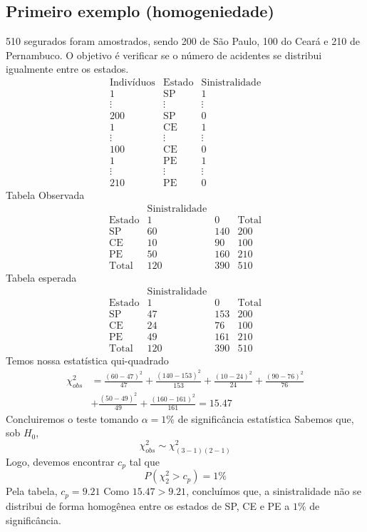 \documentclass[
  letterpaper,
  DIV=11,
  numbers=noendperiod]{scrreprt}
\begin{document}
\subsection{Primeiro exemplo
(homogeniedade)}\label{primeiro-exemplo-homogeniedade}

510 segurados foram amostrados, sendo 200 de São Paulo, 100 do Ceará e
210 de Pernambuco. O objetivo é verificar se o número de acidentes se
distribui igualmente entre os estados. \[
\begin{array}{ccc}
\mathrm{Indivíduos}  & \mathrm{Estado}  & \mathrm{Sinistralidade}\\
1 & \mathrm{SP} & 1 \\
\vdots  & \vdots & \vdots \\
200  &  \mathrm{SP}  & 0 \\
1 & \mathrm{CE} & 1 \\
\vdots  & \vdots & \vdots \\
100  &  \mathrm{CE}  & 0 \\
1 & \mathrm{PE} & 1 \\
\vdots  & \vdots & \vdots \\
210  &  \mathrm{PE}  & 0
\end{array}
\] Tabela Observada \[
\begin{array}{c|cc|c}
 &     \mathrm{Sinistralidade}   &  \\
\mathrm{Estado}  & 1 & 0 &  \mathrm{Total} \\
\hline
\mathrm{SP} & 60 & 140 & 200 \\
\mathrm{CE} & 10 & 90 & 100 \\
\mathrm{PE} & 50 & 160 & 210 \\
\hline
\mathrm{Total} & 120 & 390 & 510
\end{array}
\] Tabela esperada \[
\begin{array}{c|cc|c}
 &     \mathrm{Sinistralidade}   &  \\
\mathrm{Estado}  & 1 & 0 &  \mathrm{Total} \\
\hline
\mathrm{SP} & 47 & 153 & 200 \\
\mathrm{CE} & 24 & 76 & 100 \\
\mathrm{PE} & 49 & 161 & 210 \\
\hline
\mathrm{Total} & 120 & 390 & 510
\end{array}
\] Temos nossa estatística qui-quadrado \[
\begin{aligned}
\chi^2_{obs} &= \frac{(60-47)^2}{47} + \frac{(140-153)^2}{153} + \frac{(10-24)^2}{24} + \frac{(90-76)^2}{76} \\
&+ \frac{(50-49)^2}{49} + \frac{(160-161)^2}{161} = 15.47
\end{aligned}
\] Concluiremos o teste tomando \(\alpha = 1\%\) de significância
estatística Sabemos que, sob \(H_{0}\), \[
\chi^2_{obs} \sim \chi^2_{(3-1)(2-1)}
\] Logo, devemos encontrar \(c_{p}\) tal que \[
P(\chi^2_{2}> c_{p}) = 1\%
\] Pela tabela, \(c_{p}=9.21\) Como \(15.47 > 9.21\), concluímos que, a
sinistralidade não se distribui de forma homogênea entre os estados de
SP, CE e PE a \(1\%\) de significância.
\end{document}
